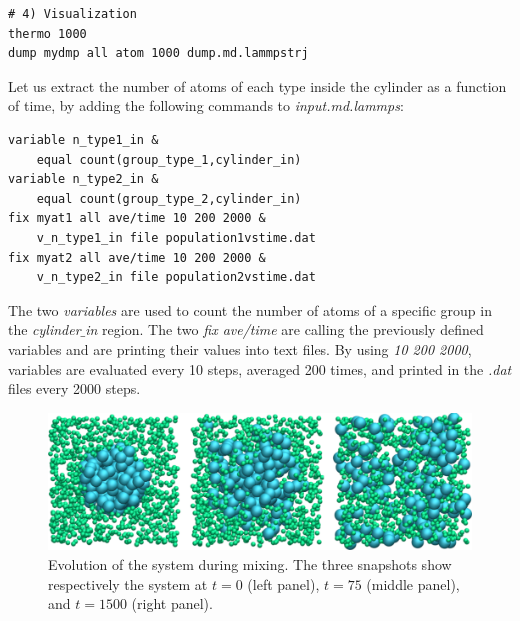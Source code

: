 \documentclass[9pt,tutorial]{livecoms}
\begin{document}
{\normalsize \begin{verbatim}
# 4) Visualization
thermo 1000
dump mydmp all atom 1000 dump.md.lammpstrj
\end{verbatim}}
Let us extract the number of atoms of each type inside the cylinder as a function of time, by adding the following commands to \textit{input.md.lammps}:
{\normalsize \begin{verbatim}
variable n_type1_in &
    equal count(group_type_1,cylinder_in)
variable n_type2_in & 
    equal count(group_type_2,cylinder_in)
fix myat1 all ave/time 10 200 2000 &
    v_n_type1_in file population1vstime.dat
fix myat2 all ave/time 10 200 2000 &
    v_n_type2_in file population2vstime.dat
\end{verbatim}}
The two \textit{variables} are used to count the number of atoms of a specific group in the \textit{cylinder$\_$in} region. The two \textit{fix ave/time} are calling the previously defined variables and are printing their values into text files. By using \textit{10 200 2000}, variables are evaluated every 10 steps, averaged 200 times, and printed in the \textit{.dat} files every 2000 steps.

\begin{figure}
\centering
\includegraphics[width=\linewidth]{LJ-evolution}
\caption{Evolution of the system during mixing. The three snapshots show respectively the system at $t=0$ (left panel), $t=75$ (middle panel), and $t=1500$ (right panel).}
\label{fig:evolution-population}
\end{figure}
\end{document}
